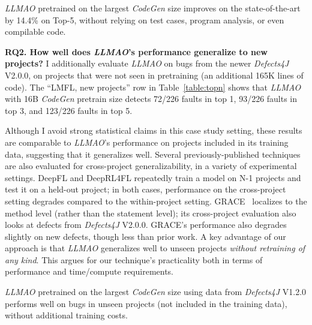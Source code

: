 \documentclass[12pt,openany,oneside,table]{cmuthesis}
\begin{document}
    
    \begin{tcolorbox}
    [colback=white,colframe=black,arc=0pt,boxrule=0.5pt,title=RQ1 Summary,boxsep=2pt,left=1pt,right=1pt,top=1pt,bottom=1pt,fonttitle=\bfseries]
    \textit{LLMAO} pretrained on the largest \textit{CodeGen} size improves on the state-of-the-art by 14.4\% on Top-5, without relying on test cases, program analysis, or even compilable code.
    \end{tcolorbox}
    
    \vspace{0.5em}
    \noindent\textbf{RQ2. How well does \textit{LLMAO}’s performance generalize to new
    projects?}
    I additionally evaluate \textit{LLMAO} on bugs from the newer \textit{Defects4J} V2.0.0, on projects that were not seen in pretraining (an additional 165K lines of code). The ``LMFL, new projects'' row in Table~\ref{table:topn} shows that \textit{LLMAO} with 16B \textit{CodeGen} pretrain size detects 72/226 faults in top 1, 93/226 faults in top 3, and 123/226 faults in top 5. 
    
    Although I avoid strong statistical claims in this case study setting, these results are comparable to \textit{LLMAO}'s performance on projects included in its training data, suggesting that it generalizes well.  Several previously-published techniques are also evaluated for cross-project generalizability, in a variety of experimental settings.  DeepFL and DeepRL4FL repeatedly train a model on N-1 projects and test it on a held-out project; in both cases, performance on the cross-project setting degrades compared to the within-project setting.  GRACE~\cite{lou2021boosting} localizes to the method level (rather than the statement level); its cross-project evaluation also looks at defects from \textit{Defects4J} V2.0.0.  GRACE's performance also degrades slightly on  new defects, though less than prior work.  A key advantage of our approach is that \textit{LLMAO} generalizes well to unseen projects \emph{without retraining of any kind}.  This argues for our technique's practicality both in terms of performance and time/compute requirements.  
    
    \begin{tcolorbox}
    [colback=white,colframe=black,arc=0pt,boxrule=0.5pt,title=RQ2 Summary,boxsep=2pt,left=1pt,right=1pt,top=1pt,bottom=1pt,fonttitle=\bfseries]
    \textit{LLMAO} pretrained on the largest \textit{CodeGen} size using data from \textit{Defects4J} V1.2.0 performs well on bugs in unseen projects (not included in the training data), without additional training costs.
    \vspace{0.5em}
    \end{tcolorbox}
    
\end{document}
